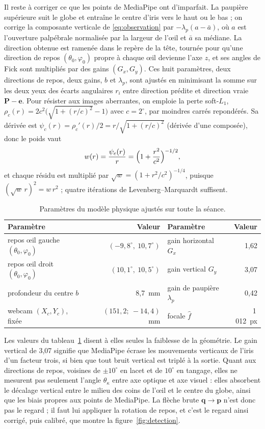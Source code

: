 \documentclass[10pt,a4paper]{article}
\newcommand{\vect}[1]{\symbf{#1}}
\begin{document}
Il reste à corriger ce que les points de MediaPipe ont d'imparfait. La paupière supérieure suit le globe et entraîne le centre d'iris vers le haut ou le bas ; on corrige la composante verticale de \eqref{eq:observation} par $-\lambda_p(a-\bar a)$, où $a$ est l'ouverture palpébrale normalisée par la largeur de l'œil et $\bar a$ sa médiane. La direction obtenue est ramenée dans le repère de la tête, tournée pour qu'une direction de repos $(\theta_0,\varphi_0)$ propre à chaque œil devienne l'axe $z$, et ses angles de Fick sont multipliés par des gains $(G_x,G_y)$. Ces huit paramètres, deux directions de repos, deux gains, $b$ et $\lambda_p$, sont ajustés en minimisant la somme sur les deux yeux des écarts angulaires $r_i$ entre direction prédite et direction vraie $\vect P-\vect e$. Pour résister aux images aberrantes, on emploie la perte soft-$L_1$, $\rho_c(r)=2c^2\bigl(\sqrt{1+(r/c)^2}-1\bigr)$ avec $c=2^\circ$, par moindres carrés repondérés. Sa dérivée est $\psi_c(r)=\rho_c'(r)/2=r/\sqrt{1+(r/c)^2}$ (dérivée d'une composée), donc le poids vaut
\begin{equation}
w(r)=\frac{\psi_c(r)}{r}=\Bigl(1+\frac{r^2}{c^2}\Bigr)^{-1/2},
\end{equation}
et chaque résidu est multiplié par $\sqrt{w}=(1+r^2/c^2)^{-1/4}$, puisque $(\sqrt w\,r)^2=w\,r^2$ ; quatre itérations de Levenberg--Marquardt suffisent.

\begin{table}[!htbp]
\centering\small
\begin{tabular}{@{}lr@{\qquad}lr@{}}
\toprule
Paramètre & Valeur & Paramètre & Valeur\\
\midrule
repos œil gauche $(\theta_0,\varphi_0)$ & $(-9{,}8^\circ,\ 10{,}7^\circ)$ & gain horizontal $G_x$ & 1,62\\
repos œil droit $(\theta_0,\varphi_0)$ & $(10{,}1^\circ,\ 10{,}5^\circ)$ & gain vertical $G_y$ & 3,07\\
profondeur du centre $b$ & 8,7~mm & gain de paupière $\lambda_p$ & 0,42\\
webcam $(X_c,Y_c)$, fixée & $(151{,}2;\ -14{,}4)$~mm & focale $\hat f$ & 1\,012~px\\
\bottomrule
\end{tabular}
\caption{Paramètres du modèle physique ajustés sur toute la séance.}\label{tab:physique}
\end{table}

Les valeurs du tableau~\ref{tab:physique} disent à elles seules la faiblesse de la géométrie. Le gain vertical de 3,07 signifie que MediaPipe écrase les mouvements verticaux de l'iris d'un facteur trois, si bien que tout bruit vertical est triplé à la sortie. Quant aux directions de repos, voisines de $\pm10^\circ$ en lacet et de $10^\circ$ en tangage, elles ne mesurent pas seulement l'angle $\theta_\kappa$ entre axe optique et axe visuel : elles absorbent le décalage vertical entre le milieu des coins de l'œil et le centre du globe, ainsi que les biais propres aux points de MediaPipe. La flèche brute $\vect q\to\vect p$ n'est donc pas le regard ; il faut lui appliquer la rotation de repos, et c'est le regard ainsi corrigé, puis calibré, que montre la figure~\ref{fig:detection}.
\end{document}
